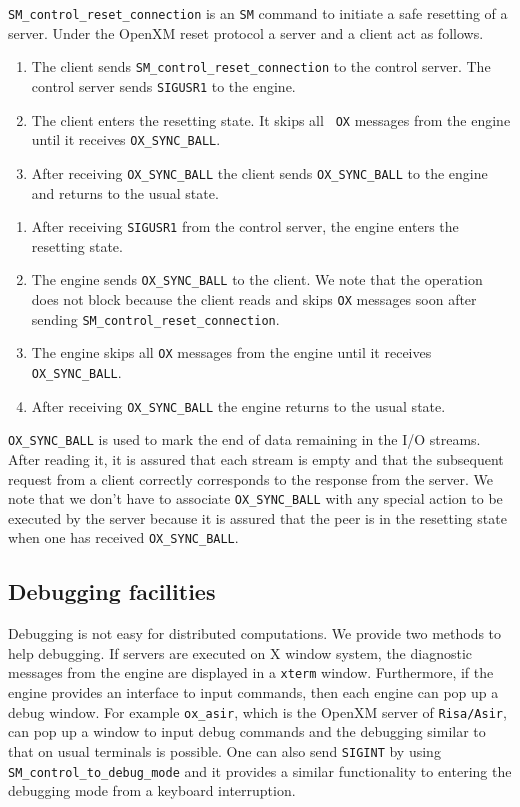 {\tt SM\_control\_reset\_connection} is an {\tt SM} command to
initiate a safe resetting of a server.
Under the OpenXM reset protocol a server and a client act as follows.

\centerline{}

\begin{enumerate}
\item The client sends {\tt SM\_control\_reset\_connection} to the
control server. The control server sends {\tt SIGUSR1} to the engine.
\item The client enters the resetting state. It skips all {\tt
OX} messages from the engine until it receives {\tt OX\_SYNC\_BALL}.
\item After receiving {\tt OX\_SYNC\_BALL} the client sends 
{\tt OX\_SYNC\_BALL} to the engine and returns to the usual state.
\end{enumerate}

\centerline{}

\begin{enumerate}
\item After receiving {\tt SIGUSR1} from the control server,
the engine enters the resetting state.
\item The engine sends {\tt OX\_SYNC\_BALL} to the client.
We note that the operation does not block because
the client reads and skips {\tt OX} messages soon after sending
{\tt SM\_control\_reset\_connection}.
\item The engine skips all {\tt OX} messages from the engine until it
receives {\tt OX\_SYNC\_BALL}.
\item After receiving {\tt OX\_SYNC\_BALL} the engine returns to the
usual state.
\end{enumerate}

{\tt OX\_SYNC\_BALL} is used to mark the end of data remaining in the
I/O streams. After reading it, it is assured that each stream is empty
and that the subsequent request from a client correctly 
corresponds to the response from the server.
We note that we don't have to associate {\tt OX\_SYNC\_BALL} with
any special action to be executed by the server because it is
assured that the peer is in the resetting state when one has received
{\tt OX\_SYNC\_BALL}.

\subsection{Debugging facilities}
Debugging is not easy for distributed computations.
We provide two methods to help debugging.
If servers are executed on X window system, 
the diagnostic messages from the engine are displayed in a {\tt xterm}
window.
Furthermore, if the engine provides an interface to input commands,
then each engine can pop up a debug window.
For example {\tt ox\_asir}, which is
the OpenXM server of {\tt Risa/Asir}, can pop up a window to input
debug commands and the debugging similar to that on usual terminals is possible.
One can also send {\tt SIGINT} by using {\tt SM\_control\_to\_debug\_mode}
and it provides a similar functionality to entering the debugging
mode from a keyboard interruption.
